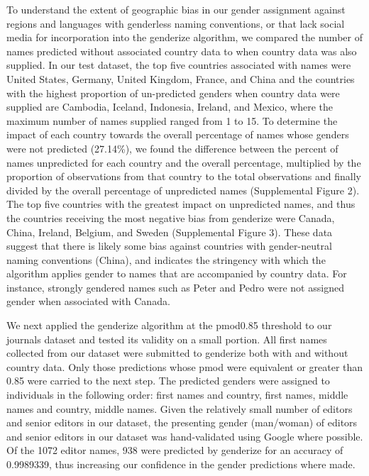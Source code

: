 \documentclass[11pt,]{article}
\begin{document}
To understand the extent of geographic bias in our gender assignment
against regions and languages with genderless naming conventions, or
that lack social media for incorporation into the genderize algorithm,
we compared the number of names predicted without associated country
data to when country data was also supplied. In our test dataset, the
top five countries associated with names were United States, Germany,
United Kingdom, France, and China and the countries with the highest
proportion of un-predicted genders when country data were supplied are
Cambodia, Iceland, Indonesia, Ireland, and Mexico, where the maximum
number of names supplied ranged from 1 to 15. To determine the impact of
each country towards the overall percentage of names whose genders were
not predicted (27.14\%), we found the difference between the percent of
names unpredicted for each country and the overall percentage,
multiplied by the proportion of observations from that country to the
total observations and finally divided by the overall percentage of
unpredicted names (Supplemental Figure 2). The top five countries with
the greatest impact on unpredicted names, and thus the countries
receiving the most negative bias from genderize were Canada, China,
Ireland, Belgium, and Sweden (Supplemental Figure 3). These data suggest
that there is likely some bias against countries with gender-neutral
naming conventions (China), and indicates the stringency with which the
algorithm applies gender to names that are accompanied by country data.
For instance, strongly gendered names such as Peter and Pedro were not
assigned gender when associated with Canada.

We next applied the genderize algorithm at the pmod0.85 threshold to our
journals dataset and tested its validity on a small portion. All first
names collected from our dataset were submitted to genderize both with
and without country data. Only those predictions whose pmod were
equivalent or greater than 0.85 were carried to the next step. The
predicted genders were assigned to individuals in the following order:
first names and country, first names, middle names and country, middle
names. Given the relatively small number of editors and senior editors
in our dataset, the presenting gender (man/woman) of editors and senior
editors in our dataset was hand-validated using Google where possible.
Of the 1072 editor names, 938 were predicted by genderize for an
accuracy of 0.9989339, thus increasing our confidence in the gender
predictions where made.
\end{document}
